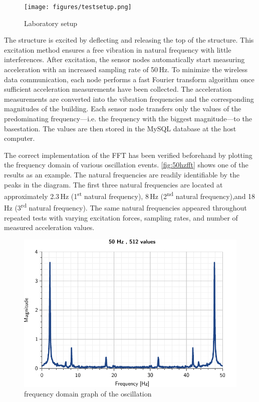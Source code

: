 \documentclass[12pt,a4paper]{scrartcl}
\begin{document}

\begin{figure}[ht]
    \centering
    \texttt{[image: figures/testsetup.png]}
    \caption{Laboratory setup}
    \label{fig:teststructure}
\end{figure}

The structure is excited by deflecting and releasing the top of the structure.
This excitation method ensures a free vibration in natural frequency with little interferences.
After excitation, the sensor nodes automatically start measuring acceleration with an increased sampling rate of 50\,Hz.
To minimize the wireless data communication, each node performs a fast Fourier transform algorithm once sufficient acceleration measurements have been collected.
The acceleration measurements are converted into the vibration frequencies and the corresponding magnitudes of the building.
Each sensor node transfers only the values of the predominating frequency---i.e. the frequency with the biggest magnitude---to the basestation. 
The values are then stored in the MySQL database at the host computer.

The correct implementation of the FFT has been verified beforehand by plotting the frequency domain of various oscillation events.
\autoref{fig:50hzfft} shows  one of the results as an example.
The natural frequencies are readily identifiable by the peaks in the diagram.
The first three natural frequencies are located at approximately 2.3\,Hz (1\textsuperscript{st} natural frequency), 8\,Hz (2\textsuperscript{nd} natural frequency),and 18\,Hz (3\textsuperscript{rd} natural frequency).
The same natural frequencies appeared throughout repeated tests with varying excitation forces, sampling rates, and number of measured acceleration values.

\begin{figure}[ht]
    \centering
    \includegraphics{figures/50Hz.pdf}
    \caption{frequency domain graph of the oscillation}
    \label{fig:50hzfft}
\end{figure}
\end{document}
